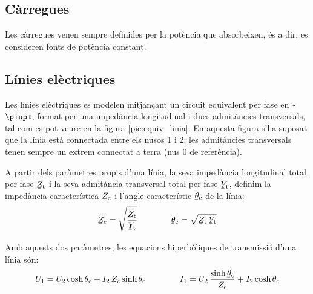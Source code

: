 \subsection{Càrregues}

Les càrregues venen sempre definides per la potència que absorbeixen, és a dir, es consideren fonts de potència constant.

\subsection{Línies elèctriques} 

Les línies elèctriques es modelen mitjançant un circuit equivalent
per fase en «$\piup$», format per una impedància longitudinal i dues
admitàncies transversals, tal com es pot veure en la figura
\vref{pic:equiv_linia}. En aquesta figura s'ha suposat que la línia
està connectada entre els nusos 1 i 2; les admitàncies transversals
tenen sempre un extrem connectat a terra (nus 0 de referència).

\begin{center}
    
    \label{pic:equiv_linia}
\end{center}

A partir dels paràmetres propis d'una línia, la seva impedància
longitudinal  total per fase $\cmplx{Z}\ped{t}$ i la seva admitància
transversal total per fase $\cmplx{Y}\ped{t}$, definim la impedància
característica $\cmplx{Z}\ped{c}$ i l'angle característic
$\cmplx{\theta}\ped{c}$ de la línia:   
\begin{equation}
   \cmplx{Z}\ped{c} = \sqrt{\frac{\cmplx{Z}\ped{t}}{\cmplx{Y}\ped{t}}} \qquad \qquad
   \cmplx{\theta}\ped{c} = \sqrt{\cmplx{Z}\ped{t} \,\cmplx{Y}\ped{t} }
\end{equation}

Amb aquests dos paràmetres, les equacions hiperbòliques de
transmissió d'una línia són: 
\begin{equation}\label{eq:linia_eq_trans}
   \cmplx{U}_1 = \cmplx{U}_2 \cosh \cmplx{\theta}\ped{c}  + \cmplx{I}_2 \,\cmplx{Z}\ped{c} \sinh \cmplx{\theta}\ped{c}   \qquad \qquad
   \cmplx{I}_1 = \cmplx{U}_2 \, \frac{\sinh \cmplx{\theta}\ped{c}}{\cmplx{Z}\ped{c}}  +   \cmplx{I}_2 \cosh \cmplx{\theta}\ped{c}
\end{equation}

